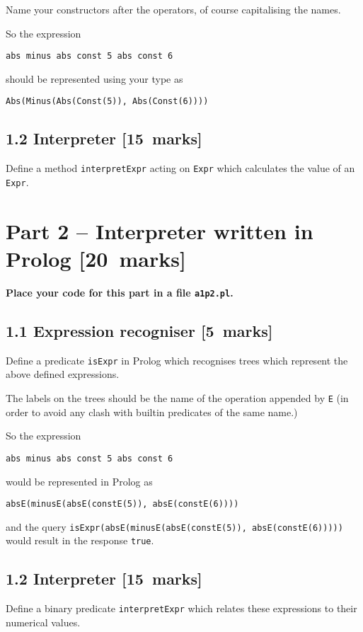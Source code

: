 \documentclass[11pt]{article}
\begin{document}
Name your constructors after the operators,
of course capitalising the names.

So the expression
\begin{verbatim}
abs minus abs const 5 abs const 6
\end{verbatim}
should be represented using your type as
\begin{verbatim}
Abs(Minus(Abs(Const(5)), Abs(Const(6))))
\end{verbatim}

\subsection*{1.2 Interpreter    [15 marks]}
\label{sec:org42b6f3c}
Define a method \texttt{interpretExpr} acting on \texttt{Expr} which
calculates the value of an \texttt{Expr}.

\section*{Part 2 – Interpreter written in Prolog [20 marks]}
\label{sec:org69ac6cd}
\begin{center}
\textbf{Place your code for this part in a file \texttt{a1p2.pl}.}
\end{center}

\subsection*{1.1 Expression recogniser [5 marks]}
\label{sec:org6682154}
Define a predicate \texttt{isExpr} in Prolog which recognises
trees which represent the above defined expressions.

The labels on the trees should be the name of the operation
appended by \texttt{E} (in order to avoid any clash with builtin predicates
of the same name.)

So the expression
\begin{verbatim}
abs minus abs const 5 abs const 6
\end{verbatim}
would be represented in Prolog as
\begin{verbatim}
absE(minusE(absE(constE(5)), absE(constE(6))))
\end{verbatim}
and the query \texttt{isExpr(absE(minusE(absE(constE(5)), absE(constE(6)))))} would
result in the response \texttt{true}.

\subsection*{1.2 Interpreter           [15 marks]}
\label{sec:org6994958}
Define a binary predicate \texttt{interpretExpr} which
relates these expressions to their numerical values.
\end{document}

